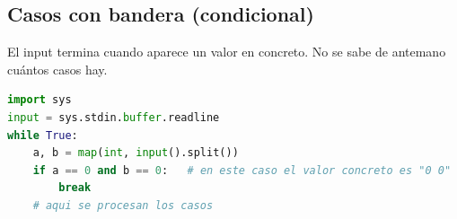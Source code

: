 \subsection{Casos con bandera (condicional)}
\label{alg:1-3}

El input termina cuando aparece un valor en concreto. No se sabe de antemano cuántos casos hay.

\begin{lstlisting}[language=Python]
import sys
input = sys.stdin.buffer.readline
while True:
    a, b = map(int, input().split())
    if a == 0 and b == 0:   # en este caso el valor concreto es "0 0"
        break
    # aqui se procesan los casos
\end{lstlisting}
